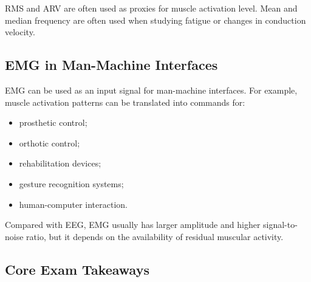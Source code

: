 \begin{authornote}
RMS and ARV are often used as proxies for muscle activation level. Mean and median frequency are often used when studying fatigue or changes in conduction velocity.
\end{authornote}

\subsection{EMG in Man-Machine Interfaces}

EMG can be used as an input signal for man-machine interfaces. For example, muscle activation patterns can be translated into commands for:

\begin{itemize}[noitemsep]
    \item prosthetic control;
    \item orthotic control;
    \item rehabilitation devices;
    \item gesture recognition systems;
    \item human-computer interaction.
\end{itemize}

Compared with EEG, EMG usually has larger amplitude and higher signal-to-noise ratio, but it depends on the availability of residual muscular activity.

\subsection{Core Exam Takeaways}

